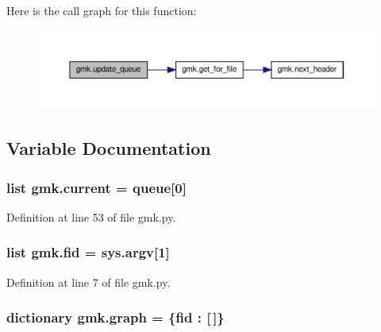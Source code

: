 Here is the call graph for this function\-:
\nopagebreak
\begin{figure}[H]
\begin{center}
\leavevmode
\includegraphics[width=350pt]{namespacegmk_a89cafb99ddb6201733d0ffa136f7e557_cgraph}
\end{center}
\end{figure}




\subsection{Variable Documentation}
\hypertarget{namespacegmk_a4a4fbb8f70406eba80376b46aacdc47d}{
\subsubsection[{current}]{\setlength{\rightskip}{0pt plus 5cm}list gmk.\-current = {\bf queue}\mbox{[}0\mbox{]}}}\label{namespacegmk_a4a4fbb8f70406eba80376b46aacdc47d}


Definition at line 53 of file gmk.\-py.

\hypertarget{namespacegmk_a29c54310ed5d6c9d85f4ed018c7cc07c}{
\subsubsection[{fid}]{\setlength{\rightskip}{0pt plus 5cm}list gmk.\-fid = sys.\-argv\mbox{[}1\mbox{]}}}\label{namespacegmk_a29c54310ed5d6c9d85f4ed018c7cc07c}


Definition at line 7 of file gmk.\-py.

\hypertarget{namespacegmk_a2be856cc48bb4565e8b772d6a27df1f1}{
\subsubsection[{graph}]{\setlength{\rightskip}{0pt plus 5cm}dictionary gmk.\-graph = \{{\bf fid} \-: \mbox{[}$\,$\mbox{]}\}}}\label{namespacegmk_a2be856cc48bb4565e8b772d6a27df1f1}


